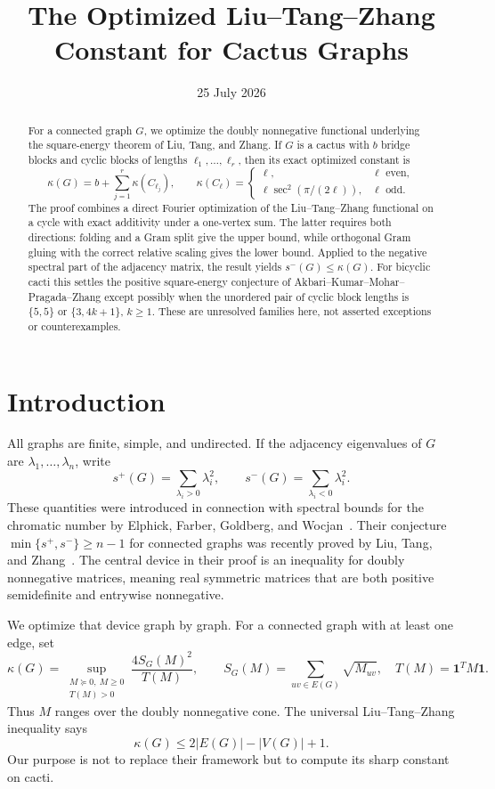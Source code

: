 \documentclass[11pt]{article}
\title{The Optimized Liu--Tang--Zhang Constant for Cactus Graphs}
\author{}
\date{25 July 2026}
\theoremstyle{remark}
\newcommand{\one}{\mathbf 1}
\begin{document}
\maketitle

\begin{abstract}
For a connected graph $G$, we optimize the doubly nonnegative functional
underlying the square-energy theorem of Liu, Tang, and Zhang.  If $G$ is a
cactus with $b$ bridge blocks and cyclic blocks of lengths
$\ell_1,\ldots,\ell_r$, then its exact optimized constant is
\[
 \kappa(G)=b+\sum_{j=1}^r\kappa(C_{\ell_j}),
 \qquad
 \kappa(C_\ell)=
 \begin{cases}
  \ell,&\ell\text{ even},\\
  \ell\sec^2(\pi/(2\ell)),&\ell\text{ odd}.
 \end{cases}
\]
 The proof combines a direct Fourier optimization of the
 Liu--Tang--Zhang functional on a cycle with exact additivity under a
 one-vertex sum.
The latter requires both directions: folding and a Gram split give the upper
bound, while orthogonal Gram gluing with the correct relative scaling gives
the lower bound.  Applied to the negative spectral part of the adjacency
matrix, the result yields $s^-(G)\leq\kappa(G)$.  For bicyclic cacti this
settles the positive square-energy conjecture of
Akbari--Kumar--Mohar--Pragada--Zhang except possibly when the unordered pair
of cyclic block lengths is $\{5,5\}$ or $\{3,4k+1\}$, $k\geq1$.  These are
unresolved families here, not asserted exceptions or counterexamples.
\end{abstract}

\section{Introduction}

All graphs are finite, simple, and undirected.  If the adjacency eigenvalues
of $G$ are $\lambda_1,\ldots,\lambda_n$, write
\[
 s^+(G)=\sum_{\lambda_i>0}\lambda_i^2,
 \qquad
 s^-(G)=\sum_{\lambda_i<0}\lambda_i^2.
\]
These quantities were introduced in connection with spectral bounds for the
chromatic number by Elphick, Farber, Goldberg, and Wocjan~\cite{EFGW}.  Their
conjecture $\min\{s^+,s^-\}\geq n-1$ for connected graphs was recently proved
by Liu, Tang, and Zhang~\cite{LTZ}.  The central device in their proof is an
inequality for doubly nonnegative matrices, meaning real symmetric matrices
that are both positive semidefinite and entrywise nonnegative.

We optimize that device graph by graph.  For a connected graph with at least
one edge, set
\begin{equation}\label{eq:kappa-definition}
 \kappa(G)=
 \sup_{\substack{M\succeq0,\ M\geq0\\T(M)>0}}
 \frac{4S_G(M)^2}{T(M)},
 \qquad
 S_G(M)=\sum_{uv\in E(G)}\sqrt{M_{uv}},
 \quad T(M)=\one^TM\one.
\end{equation}
Thus $M$ ranges over the doubly nonnegative cone.  The universal
Liu--Tang--Zhang inequality says
\[
 \kappa(G)\leq 2|E(G)|-|V(G)|+1.
\]
Our purpose is not to replace their framework but to compute its sharp
constant on cacti.
\end{document}
